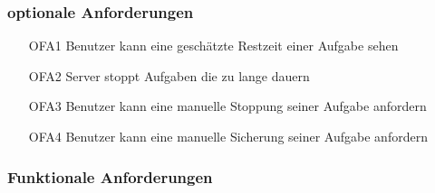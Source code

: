 \documentclass[a4paper,12pt]{article}
\begin{document}



\subsubsection{optionale Anforderungen}
\begin{itemize}[nosep]
\leftskip=0.5cm
\item[OFA1] Benutzer kann eine geschätzte Restzeit einer Aufgabe sehen	
\item[OFA2] Server stoppt Aufgaben die zu lange dauern %
\item[OFA3] Benutzer kann eine manuelle Stoppung seiner Aufgabe anfordern
\item[OFA4] Benutzer kann eine manuelle Sicherung seiner Aufgabe anfordern
\end{itemize}






\subsubsection{Funktionale Anforderungen}
\end{document}
